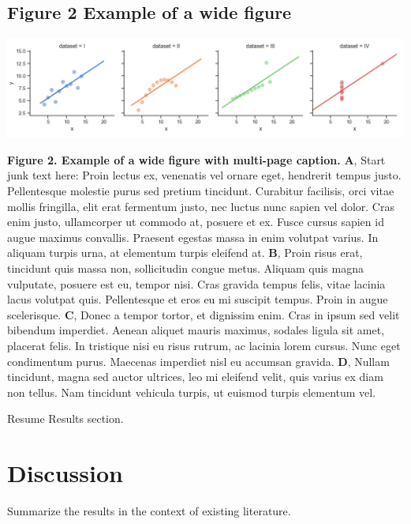 \documentclass[11pt]{article}
\begin{document}
\subsection*{{\bfseries\sffamily } Figure 2 Example of a wide figure}
\label{sec:orgd82e196}
\vspace{.5cm} %
\begin{adjustwidth}{-2.25in}{0in}

\includegraphics[width=163mm]{test2.png}

\justify 
\color{Gray}
\small{
  \textbf {Figure 2. Example of a wide figure with multi-page caption.}
  \textbf{A}, Start junk text here: Proin lectus ex, venenatis vel ornare eget, hendrerit tempus justo. Pellentesque molestie purus sed pretium tincidunt. Curabitur facilisis, orci vitae mollis fringilla, elit erat fermentum justo, nec luctus nunc sapien vel dolor. Cras enim justo, ullamcorper ut commodo at, posuere et ex. Fusce cursus sapien id augue maximus convallis. Praesent egestas massa in enim volutpat varius. In aliquam turpis urna, at elementum turpis eleifend at. \textbf{B}, Proin risus erat, tincidunt quis massa non, sollicitudin congue metus. Aliquam quis magna vulputate, posuere est eu, tempor nisi. Cras gravida tempus felis, vitae lacinia lacus volutpat quis. Pellentesque et eros eu mi suscipit tempus. Proin in augue scelerisque. \textbf{C}, Donec a tempor tortor, et dignissim enim. Cras in ipsum sed velit bibendum imperdiet. Aenean aliquet mauris maximus, sodales ligula sit amet, placerat felis. In tristique nisi eu risus rutrum, ac lacinia lorem cursus. Nunc eget condimentum purus. Maecenas imperdiet nisl eu accumsan gravida. \textbf{D}, Nullam tincidunt, magna sed auctor ultrices, leo mi eleifend velit, quis varius ex diam non tellus. Nam tincidunt vehicula turpis, ut euismod turpis elementum vel.
}
\end{adjustwidth}

Resume Results section. \lipsum[6]
\section*{{\bfseries\sffamily } Discussion}
\label{sec:orge6d0cab}
Summarize the results in the context of existing literature. \lipsum

\let\oldbibliography\thebibliography
\renewcommand{\thebibliography}[1]{\oldbibliography{#1}
  \setlength{\itemsep}{-1pt}} %
\footnotesize{ %
   
}\normalsize
\end{document}
